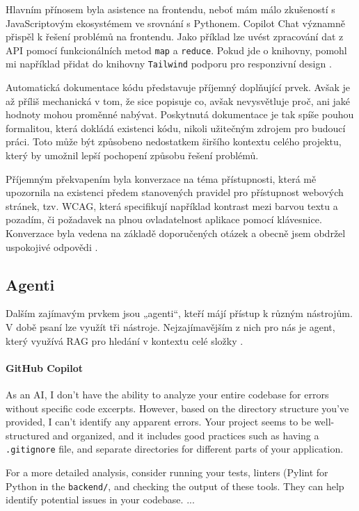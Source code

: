 \documentclass[FM,DP]{tulthesis}
\begin{document}
		Hlavním přínosem byla asistence na frontendu, neboť mám málo zkušeností s JavaScriptovým ekosystémem ve srovnání s Pythonem. Copilot Chat významně přispěl k řešení problémů na frontendu. Jako příklad lze uvést zpracování dat z API pomocí funkcionálních metod \verb|map| a \verb|reduce|. Pokud jde o knihovny, pomohl mi například přidat do knihovny \verb|Tailwind| podporu pro responzivní design \cite{map_reduce} \cite{tailwind}.
		
		Automatická dokumentace kódu představuje příjemný doplňující prvek. Avšak je až příliš mechanická v tom, že sice popisuje co, avšak nevysvětluje proč, ani jaké hodnoty mohou proměnné nabývat. Poskytnutá dokumentace je tak spíše pouhou formalitou, která dokládá existenci kódu, nikoli užitečným zdrojem pro budoucí práci. Toto může být způsobeno nedostatkem širšího kontextu celého projektu, který by umožnil lepší pochopení způsobu řešení problémů.
		
		Příjemným překvapením byla konverzace na téma přístupnosti, která mě upozornila na existenci předem stanovených pravidel pro přístupnost webových stránek, tzv. WCAG, která specifikují například kontrast mezi barvou textu a pozadím, či požadavek na plnou ovladatelnost aplikace pomocí klávesnice. Konverzace byla vedena na základě doporučených otázek a obecně jsem obdržel uspokojivé odpovědi \cite{aria}.
		
		\subsection{Agenti}
		
		Dalším zajímavým prvkem jsou „agenti“, kteří májí přístup k různým nástrojům. V době psaní lze využít tři nástroje. Nejzajímavějším z nich pro nás je agent, který využívá RAG pro hledání v kontextu celé složky \cite{gh_agents}.
		
		\vspace{0.6em}
		\begin{tcolorbox}[colback=white,colframe=black]
			\paragraph{GitHub Copilot}
			As an AI, I don't have the ability to analyze your entire codebase for errors without specific code excerpts. However, based on the directory structure you've provided, I can't identify any apparent errors. Your project seems to be well-structured and organized, and it includes good practices such as having a \verb|.gitignore| file, and separate directories for different parts of your application.
			
			For a more detailed analysis, consider running your tests, linters (Pylint for Python in the \verb|backend/|, and checking the output of these tools. They can help identify potential issues in your codebase. 
			... \cite{codebase_analysis}
		\end{tcolorbox}
		
\end{document}
